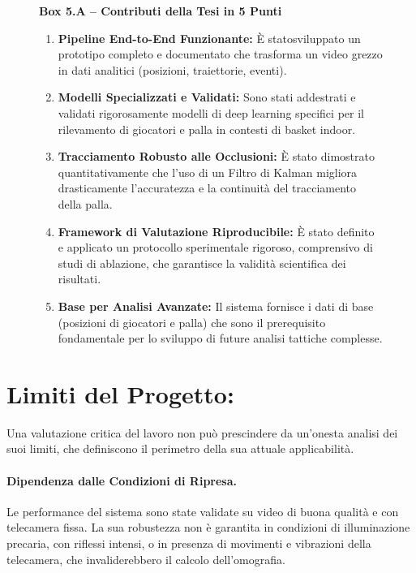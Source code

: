 \documentclass[12pt,a4paper,openright,twoside]{book}
\begin{document}
\begin{figure}[h]
\centering
{}
\label{box:contributi_tesi}
\textbf{Box 5.A -- Contributi della Tesi in 5 Punti}
\begin{enumerate}
  \item \textbf{Pipeline End-to-End Funzionante:} È statosviluppato 
  un prototipo completo e documentato che trasforma un video grezzo 
  in dati analitici (posizioni, traiettorie, eventi).
  \item \textbf{Modelli Specializzati e Validati:} Sono stati 
  addestrati e validati rigorosamente modelli di deep learning 
  specifici per il rilevamento di giocatori e palla in contesti di 
  basket indoor.
  \item \textbf{Tracciamento Robusto alle Occlusioni:} È stato 
  dimostrato quantitativamente che l'uso di un Filtro di Kalman
  migliora drasticamente l'accuratezza e la continuità del
  tracciamento della palla.
  \item \textbf{Framework di Valutazione Riproducibile:} È stato 
  definito e applicato un protocollo sperimentale rigoroso,
  comprensivo di studi di ablazione, che garantisce la validità
  scientifica dei risultati.
  \item \textbf{Base per Analisi Avanzate:} Il sistema
  fornisce i dati di base (posizioni di giocatori e palla) che sono
  il prerequisito fondamentale per lo sviluppo di future analisi
  tattiche complesse.
\end{enumerate}
\end{figure}


\section{Limiti del Progetto:}
\label{sec:limiti-progetto}

Una valutazione critica del lavoro non può prescindere da un'onesta
analisi dei suoi limiti, che definiscono il perimetro della sua
attuale applicabilità.
\paragraph{Dipendenza dalle Condizioni di Ripresa.} 
Le performance del sistema sono state validate su video di buona 
qualità e con telecamera fissa. 
La sua robustezza non è garantita in condizioni di illuminazione 
precaria, con riflessi intensi, o in presenza di movimenti e 
vibrazioni della telecamera, che invaliderebbero il calcolo 
dell'omografia.
\end{document}
